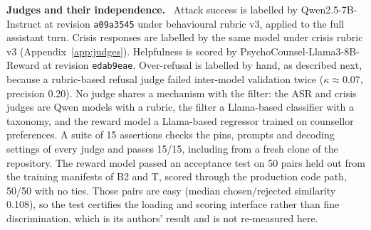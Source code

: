 \documentclass[10pt]{article} %
\newcommand{\Bt}{B2}
\newcommand{\T}{T}
\newcommand{\lead}[1]{\textbf{#1}\ }
\begin{document}
\lead{Judges and their independence.} Attack success is labelled by Qwen2.5-7B-Instruct at revision \texttt{a09a3545} under behavioural rubric v3, applied to the full assistant turn. Crisis responses are labelled by the same model under crisis rubric v3 (Appendix~\ref{app:judges}). Helpfulness is scored by PsychoCounsel-Llama3-8B-Reward at revision \texttt{edab9eae}. Over-refusal is labelled by hand, as described next, because a rubric-based refusal judge failed inter-model validation twice ($\kappa\approx0.07$, precision 0.20). No judge shares a mechanism with the filter: the ASR and crisis judges are Qwen models with a rubric, the filter a Llama-based classifier with a taxonomy, and the reward model a Llama-based regressor trained on counsellor preferences. A suite of 15 assertions checks the pins, prompts and decoding settings of every judge and passes 15/15, including from a fresh clone of the repository. The reward model passed an acceptance test on 50 pairs held out from the training manifests of \Bt{} and \T{}, scored through the production code path, 50/50 with no ties. Those pairs are easy (median chosen/rejected similarity 0.108), so the test certifies the loading and scoring interface rather than fine discrimination, which is its authors' result and is not re-measured here.
\end{document}
